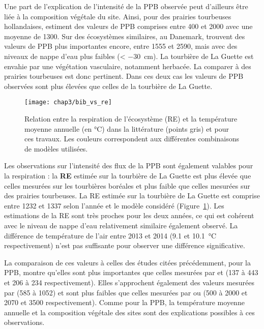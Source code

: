 Une part de l'explication de l'intensité de la PPB observée peut d'ailleurs être liée à la composition végétale du site.
Ainsi, \citet{jacobs2007} pour des prairies tourbeuses hollandaises, estiment des valeurs de PPB comprises entre 400 et \SI{2000}{\gcma} avec une moyenne de \SI{1300}{\gcma}.
Sur des écosystèmes similaires, au Danemark, \citet{gorres2014} trouvent des valeurs de PPB plus importantes encore, entre 1555 et \SI{2590}{\gcma}, mais avec des niveaux de nappe d'eau plus faibles (< \SI{-30}{\centi\metre}).
La tourbière de La Guette est envahie par une végétation vasculaire, notamment herbacée.
La comparer à des prairies tourbeuses est donc pertinent.
Dans ces deux cas les valeurs de PPB observées sont plus élevées que celles de la tourbière de La Guette.


\begin{figure}
\centering
\texttt{[image: chap3/bib\_vs\_re]}
\caption{Relation entre la respiration de l'écosystème (RE) et la température moyenne annuelle (en °C) dans la littérature (points gris) et pour ces travaux. Les couleurs correspondent aux différentes combinaisons de modèles utilisées.}
\label{fig:bib_vs_re}
\end{figure}

Les observations sur l'intensité des flux de la PPB sont également valables pour la respiration : la \textbf{RE} estimée sur la tourbière de La Guette est plus élevée que celles mesurées sur les tourbières boréales et plus faible que celles mesurées sur des prairies tourbeuses.
La RE estimée sur la tourbière de La Guette est comprise entre 1232 et \SI{1337}{\gcma} selon l'année et le modèle considéré (Figure~\ref{fig:bib_vs_re}).
Les estimations de la RE sont très proches pour les deux années, ce qui est cohérent avec le niveau de nappe d'eau relativement similaire également observé.
La différence de température de l'air entre 2013 et 2014 (\num{9.1} et \SI{10.1}{\degreeCelsius} respectivement) n'est pas suffisante pour observer une différence significative.

La comparaison de ces valeurs à celles des études citées précédemment, pour la PPB, montre qu'elles sont plus importantes que celles mesurées par \citet{peichl2014} et \citet{trudeau2014} (137 à \SI{443}{\gcma} et 206 à \SI{234}{\gcma} respectivement).
Elles s'approchent également des valeurs mesurées par \citet{beyer2015} (585 à \SI{1052}{\gcma}) et sont plus faibles que celles mesurées par \citet{jacobs2007} ou \citet{gorres2014} (500 à \SI{2000}{\gcma} et 2070 et \SI{3500}{\gcma} respectivement).
Comme pour la PPB, la température moyenne annuelle et la composition végétale des sites sont des explications possibles à ces observations.

